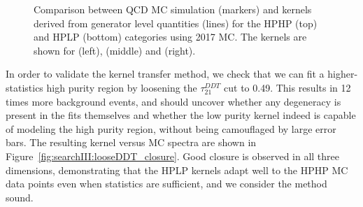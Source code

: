 \begin{figure}[h!]
\caption{Comparison between QCD MC simulation (markers) and kernels derived from generator level quantities (lines) for the HPHP (top) and HPLP (bottom) categories using 2017 MC. The kernels are shown for \MJO (left), \MJT (middle) and \MVV (right).}
\label{fig:searchIII:3Dkernels}
\end{figure}
In order to validate the kernel transfer method, we check that we can fit a higher-statistics high purity region by loosening the $\tau_{21}^{DDT}$ cut to 0.49. This results in 12 times more background events, and should uncover whether any degeneracy is present in the fits themselves and whether the low purity kernel indeed is capable of modeling the high purity region, without being camouflaged by large error bars. The resulting kernel versus MC spectra are shown in Figure~\ref{fig:searchIII:looseDDT_closure}. Good closure is observed in all three dimensions, demonstrating that the HPLP kernels adapt well to the HPHP MC data points even when statistics are sufficient, and we consider the method sound.
